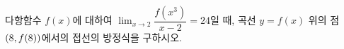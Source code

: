다항함수 $f(x)$에 대하여 $\displaystyle\lim_{x\to 2}\dfrac{f(x^3)}{x-2}=24$일 때, 곡선 $y=f(x)$ 위의 점 $(8{,}\mkern3mu\mathopen{}f(8))$에서의 접선의 방정식을 구하시오.
